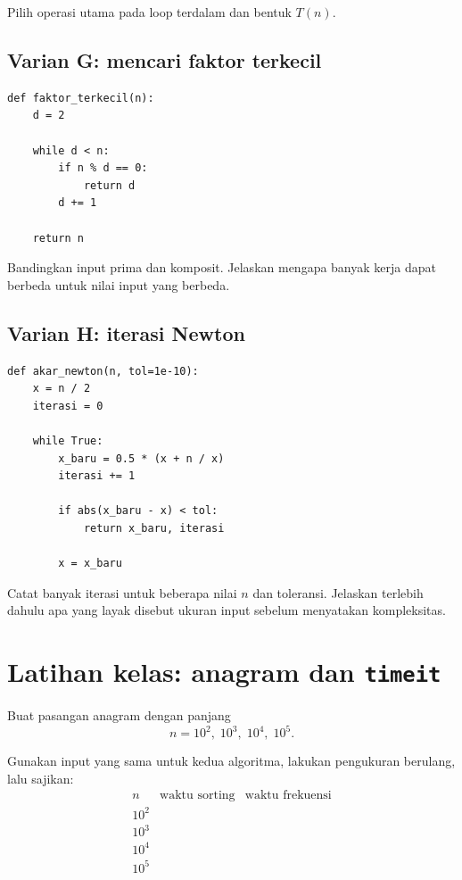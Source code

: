 \documentclass[11pt,a4paper]{report}
\begin{document}
Pilih operasi utama pada loop terdalam dan bentuk $T(n)$.

\subsection*{Varian G: mencari faktor terkecil}

\begin{lstlisting}
def faktor_terkecil(n):
    d = 2

    while d < n:
        if n % d == 0:
            return d
        d += 1

    return n
\end{lstlisting}

Bandingkan input prima dan komposit. Jelaskan mengapa banyak kerja dapat berbeda untuk
nilai input yang berbeda.

\subsection*{Varian H: iterasi Newton}

\begin{lstlisting}
def akar_newton(n, tol=1e-10):
    x = n / 2
    iterasi = 0

    while True:
        x_baru = 0.5 * (x + n / x)
        iterasi += 1

        if abs(x_baru - x) < tol:
            return x_baru, iterasi

        x = x_baru
\end{lstlisting}

Catat banyak iterasi untuk beberapa nilai $n$ dan toleransi. Jelaskan terlebih dahulu apa
yang layak disebut ukuran input sebelum menyatakan kompleksitas.

\section{Latihan kelas: anagram dan \texttt{timeit}}

Buat pasangan anagram dengan panjang
\[
n=10^2,\;10^3,\;10^4,\;10^5.
\]

Gunakan input yang sama untuk kedua algoritma, lakukan pengukuran berulang, lalu sajikan:
\[
\begin{array}{c|c|c}
n&\text{waktu sorting}&\text{waktu frekuensi}\\\hline
10^2&&\\
10^3&&\\
10^4&&\\
10^5&&
\end{array}
\]
\end{document}

